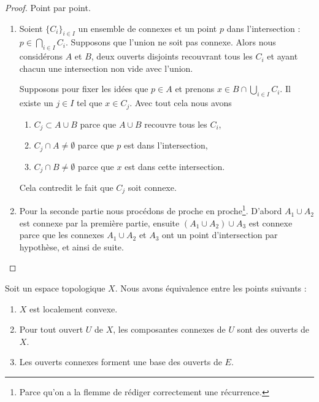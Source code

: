 \begin{proof}
	Point par point.
	\begin{enumerate}
		\item
		      Soient \( \{ C_i \}_{i\in I}\) un ensemble de connexes et un point \( p\) dans l'intersection : \( p\in\bigcap_{i\in I}C_i\). Supposons que l'union ne soit pas connexe. Alors nous considérons \( A\) et \( B\), deux ouverts disjoints recouvrant tous les \( C_i\) et ayant chacun une intersection non vide avec l'union.

		      Supposons pour fixer les idées que \( p\in A\) et prenons \( x\in B\cap\bigcup_{i\in I}C_i\). Il existe un \( j\in I\) tel que \( x\in C_j\). Avec tout cela nous avons
		      \begin{enumerate}
			      \item
			            \( C_j\subset A\cup B\) parce que \(A \cup B\) recouvre tous les \( C_i \),
			      \item
			            \( C_j\cap A\neq \emptyset\) parce que \( p\) est dans l'intersection,
			      \item
			            \( C_j\cap B\neq\emptyset\) parce que \( x\) est dans cette intersection.
		      \end{enumerate}
		      Cela contredit le fait que \( C_j\) soit connexe.

		\item

		      Pour la seconde partie nous procédons de proche en proche\footnote{Parce qu'on a la flemme de rédiger correctement une récurrence.}. D'abord \( A_1\cup A_2\) est connexe par la première partie, ensuite \( (A_1\cup A_2)\cup A_3\) est connexe parce que les connexes \( A_1\cup A_2\) et \( A_3\) ont un point d'intersection par hypothèse, et ainsi de suite.
	\end{enumerate}
\end{proof}

\begin{proposition}   \label{PROPooCZJGooRlyEOV}
	Soit un espace topologique \( X\). Nous avons équivalence entre les points suivants :
	\begin{enumerate}
		\item
		      \( X\) est localement convexe.
		\item
		      Pour tout ouvert \( U\) de \( X\), les composantes connexes de \( U\) sont des ouverts de \( X\).
		\item
		      Les ouverts connexes forment une base des ouverts de \( E\).
	\end{enumerate}
\end{proposition}

